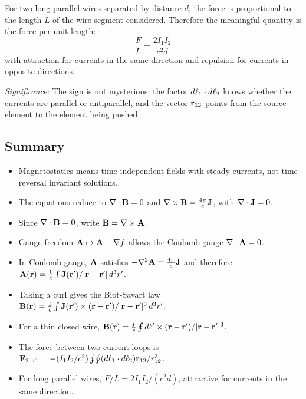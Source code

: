 For two long parallel wires separated by distance $d$, the force is proportional to the
length $L$ of the wire segment considered.  Therefore the meaningful quantity is the
force per unit length:
\begin{equation}\label{eq:lec14-parallel-wire-force}
  \boxed{
    \frac{F}{L}=\frac{2I_1I_2}{c^2 d}
  }
\end{equation}
with attraction for currents in the same direction and repulsion for currents in
opposite directions.

\textit{Significance:} The sign is not mysterious: the factor
$d\mathbf{\ell}_1\cdot d\mathbf{\ell}_2$ knows whether the currents are parallel or
antiparallel, and the vector $\mathbf{r}_{12}$ points from the source element to the element
being pushed.

\subsection{Summary}\label{subsec:lec14-summary}

\begin{itemize}
  \item Magnetostatics means time-independent fields with steady currents, not
        time-reversal invariant solutions.
  \item The equations reduce to $\nabla \cdot\mathbf{B}=0$ and
        $\nabla\times\mathbf{B}=\frac{4\pi}{c}\mathbf{J}$, with $\nabla \cdot\mathbf{J}=0$.
  \item Since $\nabla \cdot\mathbf{B}=0$, write $\mathbf{B}=\nabla\times\mathbf{A}$.
  \item Gauge freedom $\mathbf{A}\mapsto\mathbf{A}+\nabla f$ allows the Coulomb gauge
        $\nabla \cdot\mathbf{A}=0$.
  \item In Coulomb gauge, $\mathbf{A}$ satisfies
        $-\nabla^2\mathbf{A}=\frac{4\pi}{c}\mathbf{J}$ and therefore
        $\mathbf{A}(\mathbf{r})=\frac{1}{c}\int \mathbf{J}(\mathbf{r}')/|\mathbf{r}-\mathbf{r}'|\,d^3r'$.
  \item Taking a curl gives the Biot-Savart law
        $\mathbf{B}(\mathbf{r})=\frac{1}{c}\int
        \mathbf{J}(\mathbf{r}')\times(\mathbf{r}-\mathbf{r}')/|\mathbf{r}-\mathbf{r}'|^3\,d^3r'$.
  \item For a thin closed wire,
        $\mathbf{B}(\mathbf{r})=\frac{I}{c}\oint d\mathbf{\ell}'\times(\mathbf{r}-\mathbf{r}')/|\mathbf{r}-\mathbf{r}'|^3$.
  \item The force between two current loops is
        $\mathbf{F}_{2\to1}=-(I_1I_2/c^2)\oint\!\oint
        (d\mathbf{\ell}_1\cdot d\mathbf{\ell}_2)\mathbf{r}_{12}/r_{12}^3$.
  \item For long parallel wires,
        $F/L=2I_1I_2/(c^2d)$, attractive for currents in the same direction.
\end{itemize}
